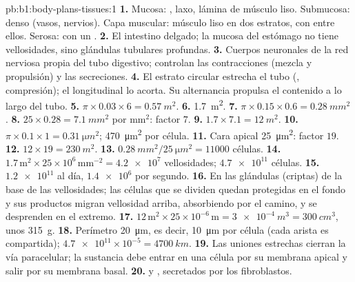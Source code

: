 \begin{solution}{pb:b1:body-plans-tissues:1}
\textbf{1.} Mucosa: ,  laxo, lámina de músculo
liso. Submucosa:  denso (vasos, nervios). Capa muscular:
músculo liso en dos estratos, con  entre ellos. Serosa:
 con un .
\textbf{2.} El intestino delgado; la mucosa del estómago no tiene
vellosidades, sino glándulas tubulares profundas.
\textbf{3.} Cuerpos neuronales de la red nerviosa propia del tubo digestivo;
controlan las contracciones (mezcla y propulsión) y las secreciones.
\textbf{4.} El estrato circular estrecha el tubo (,
compresión); el longitudinal lo acorta. Su alternancia propulsa el contenido
a lo largo del tubo.
\textbf{5.} $\pi\times 0.03\times 6 = \qty{0.57}{m^2}$.
\textbf{6.} \qty{1.7}{m^2}.
\textbf{7.} $\pi\times 0.15\times 0.6 = \qty{0.28}{mm^2}$.
\textbf{8.} $25\times 0.28 = \qty{7.1}{mm^2}$ por mm$^2$: factor $7$.
\textbf{9.} $1.7\times 7.1 = \qty{12}{m^2}$.
\textbf{10.} $\pi\times 0.1\times 1 = \qty{0.31}{\micro m^2}$;
\qty{470}{\micro m^2} por célula.
\textbf{11.} Cara apical \qty{25}{\micro m^2}: factor $19$.
\textbf{12.} $12\times 19 = \qty{230}{m^2}$.
\textbf{13.} $\qty{0.28}{mm^2}/\qty{25}{\micro m^2} = \num{11000}$ células.
\textbf{14.} $1.7\,\mathrm{m^2}\times 25\times 10^6\,\mathrm{mm^{-2}} =
\num{4.2e7}$ vellosidades; $\num{4.7e11}$ células.
\textbf{15.} $\num{1.2e11}$ al día, $\num{1.4e6}$ por segundo.
\textbf{16.} En las glándulas (criptas) de la base de las vellosidades; las
células que se dividen quedan protegidas en el fondo y sus productos migran
vellosidad arriba, absorbiendo por el camino, y se desprenden en el
extremo.
\textbf{17.} $12\,\mathrm{m^2}\times 25\times 10^{-6}\,\mathrm{m} =
\qty{3e-4}{m^3} = \qty{300}{cm^3}$, unos \qty{315}{g}.
\textbf{18.} Perímetro \qty{20}{\micro m}, es decir, \qty{10}{\micro m} por
célula (cada arista es compartida); $\num{4.7e11}\times 10^{-5} = \qty{4700}{km}$.
\textbf{19.} Las uniones estrechas cierran la vía paracelular; la sustancia
debe entrar en una célula por su membrana apical y salir por su membrana
basal.
\textbf{20.}  y , secretados por los fibroblastos.

\end{solution}
